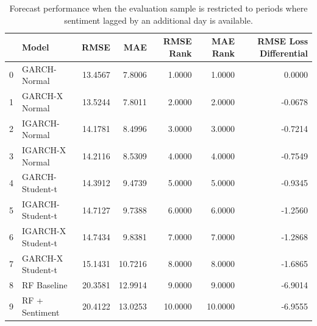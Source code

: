 \begin{table}
\caption{Forecast performance when the evaluation sample is restricted to periods where sentiment lagged by an additional day is available.}
\label{tab:robustness_sentiment_lag}
\begin{tabular}{llrrrrr}
\toprule
 & Model & RMSE & MAE & RMSE Rank & MAE Rank & RMSE Loss Differential \\
\midrule
0 & GARCH-Normal & 13.4567 & 7.8006 & 1.0000 & 1.0000 & 0.0000 \\
1 & GARCH-X Normal & 13.5244 & 7.8011 & 2.0000 & 2.0000 & -0.0678 \\
2 & IGARCH-Normal & 14.1781 & 8.4996 & 3.0000 & 3.0000 & -0.7214 \\
3 & IGARCH-X Normal & 14.2116 & 8.5309 & 4.0000 & 4.0000 & -0.7549 \\
4 & GARCH-Student-t & 14.3912 & 9.4739 & 5.0000 & 5.0000 & -0.9345 \\
5 & IGARCH-Student-t & 14.7127 & 9.7388 & 6.0000 & 6.0000 & -1.2560 \\
6 & IGARCH-X Student-t & 14.7434 & 9.8381 & 7.0000 & 7.0000 & -1.2868 \\
7 & GARCH-X Student-t & 15.1431 & 10.7216 & 8.0000 & 8.0000 & -1.6865 \\
8 & RF Baseline & 20.3581 & 12.9914 & 9.0000 & 9.0000 & -6.9014 \\
9 & RF + Sentiment & 20.4122 & 13.0253 & 10.0000 & 10.0000 & -6.9555 \\
\bottomrule
\end{tabular}
\end{table}
